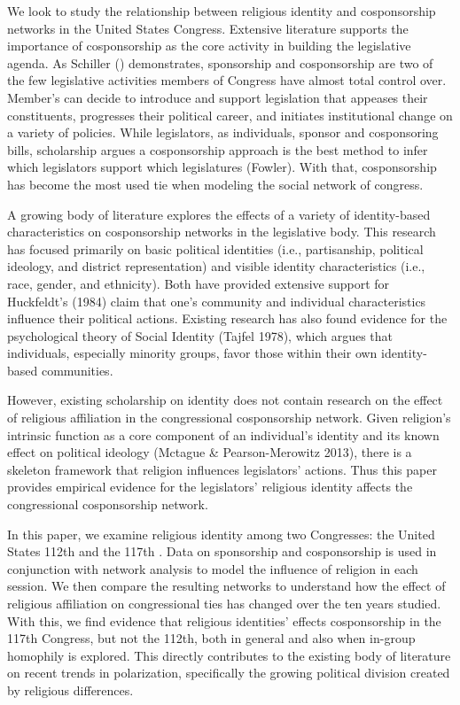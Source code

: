 \documentclass[Royal,times,sageh]{sagej}
\begin{document}
We look to study the relationship between religious identity and
cosponsorship networks in the United States Congress. Extensive
literature supports the importance of cosponsorship as the core activity
in building the legislative agenda. As Schiller () demonstrates,
sponsorship and cosponsorship are two of the few legislative activities
members of Congress have almost total control over. Member's can decide
to introduce and support legislation that appeases their constituents,
progresses their political career, and initiates institutional change on
a variety of policies. While legislators, as individuals, sponsor and
cosponsoring bills, scholarship argues a cosponsorship approach is the
best method to infer which legislators support which legislatures
(Fowler). With that, cosponsorship has become the most used tie when
modeling the social network of congress.

A growing body of literature explores the effects of a variety of
identity-based characteristics on cosponsorship networks in the
legislative body. This research has focused primarily on basic political
identities (i.e., partisanship, political ideology, and district
representation) and visible identity characteristics (i.e., race,
gender, and ethnicity). Both have provided extensive support for
Huckfeldt's (1984) claim that one's community and individual
characteristics influence their political actions. Existing research has
also found evidence for the psychological theory of Social Identity
(Tajfel 1978), which argues that individuals, especially minority
groups, favor those within their own identity-based communities.

However, existing scholarship on identity does not contain research on
the effect of religious affiliation in the congressional cosponsorship
network. Given religion's intrinsic function as a core component of an
individual's identity and its known effect on political ideology
(Mctague \& Pearson-Merowitz 2013), there is a skeleton framework that
religion influences legislators' actions. Thus this paper provides
empirical evidence for the legislators' religious identity affects the
congressional cosponsorship network.

In this paper, we examine religious identity among two Congresses: the
United States 112th and the 117th . Data on sponsorship and
cosponsorship is used in conjunction with network analysis to model the
influence of religion in each session. We then compare the resulting
networks to understand how the effect of religious affiliation on
congressional ties has changed over the ten years studied. With this, we
find evidence that religious identities' effects cosponsorship in the
117th Congress, but not the 112th, both in general and also when
in-group homophily is explored. This directly contributes to the
existing body of literature on recent trends in polarization,
specifically the growing political division created by religious
differences.
\end{document}
